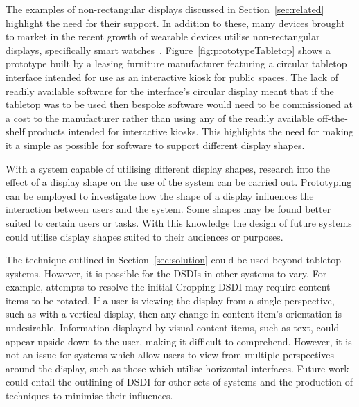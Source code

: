 \documentclass[review,5p,times,twocolumn]{elsarticle}
\begin{document}
The examples of non-rectangular displays discussed in Section~\ref{sec:related} highlight the need for their support.
In addition to these, many devices brought to market in the recent growth of wearable devices utilise non-rectangular displays, specifically smart watches~\cite{Jung2016}. %
Figure~\ref{fig:prototypeTabletop} shows a prototype built by a leasing furniture manufacturer featuring a circular tabletop interface intended for use as an interactive kiosk for public spaces.
The lack of readily available software for the interface's circular display meant that if the tabletop was to be used then bespoke software would need to be commissioned at a cost to the manufacturer rather than using any of the readily available off-the-shelf products intended for interactive kiosks.
This highlights the need for making it a simple as possible for software to support different display shapes.

\cite{Serrano2016} %
\cite{Serrano2017} %

With a system capable of utilising different display shapes, research into the effect of a display shape on the use of the system can be carried out.
Prototyping can be employed to investigate how the shape of a display influences the interaction between users and the system.
Some shapes may be found better suited to certain users or tasks.
With this knowledge the design of future systems could utilise display shapes suited to their audiences or purposes.

The technique outlined in Section~\ref{sec:solution} could be used beyond tabletop systems.
However, it is possible for the \acp{DSDI} in other systems to vary. 
For example, attempts to resolve the initial Cropping \ac{DSDI} may require content items to be rotated.
If a user is viewing the display from a single perspective, such as with a vertical display, then any change in content item's orientation is undesirable.
Information displayed by visual content items, such as text, could appear upside down to the user, making it difficult to comprehend.
However, it is not an issue for systems which allow users to view from multiple perspectives around the display, such as those which utilise horizontal interfaces.
Future work could entail the outlining of \ac{DSDI} for other sets of systems and the production of techniques to minimise their influences.
\end{document}
